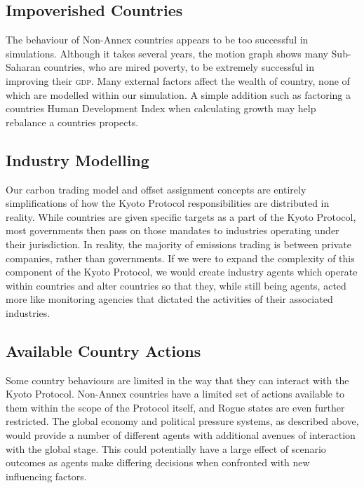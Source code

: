 \subsection{Impoverished Countries}

The behaviour of Non-Annex countries appears to be too successful in simulations.  Although it takes several years, the motion graph shows many Sub-Saharan countries, who are mired poverty, to be extremely successful in improving their \textsc{gdp}. Many external factors affect the wealth of country, none of which are modelled within our simulation.  A simple addition such as factoring a countries Human Development Index when calculating growth may help rebalance a countries propects.
 
\subsection{Industry Modelling}

Our carbon trading model and offset assignment concepts are entirely simplifications of how the Kyoto Protocol responsibilities are distributed in reality. While countries are given specific targets as a part of the Kyoto Protocol, most governments then pass on those mandates to industries operating under their jurisdiction. In reality, the majority of emissions trading is between private companies, rather than governments. If we were to expand the complexity of this component of the Kyoto Protocol, we would create industry agents which operate within countries and alter countries so that they, while still being agents, acted more like monitoring agencies that dictated the activities of their associated industries.

\subsection{Available Country Actions}

Some country behaviours are limited in the way that they can interact with the Kyoto Protocol. Non-Annex countries have a limited set of actions available to them within the scope of the Protocol itself, and Rogue states are even further restricted. The global economy and political pressure systems, as described above, would provide a number of different agents with additional avenues of interaction with the global stage. This could potentially have a large effect of scenario outcomes as agents make differing decisions when confronted with new influencing factors.
